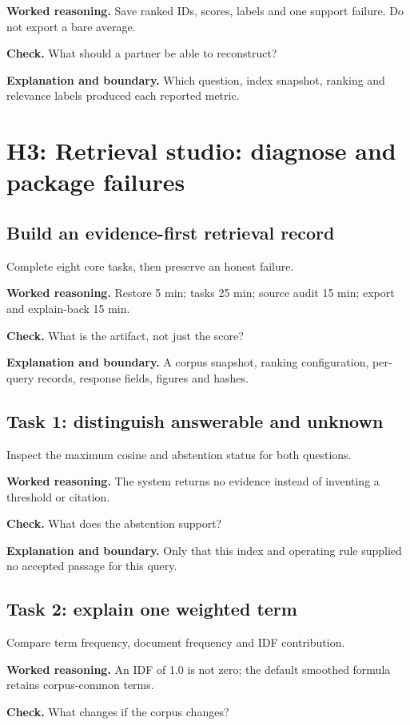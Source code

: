\textbf{Worked reasoning.} Save ranked IDs, scores, labels and one support failure. Do not export a bare average.

\textbf{Check.} What should a partner be able to reconstruct?

\textbf{Explanation and boundary.} Which question, index snapshot, ranking and relevance labels produced each reported metric.

\section{H3: Retrieval studio: diagnose and package failures}
\subsection{Build an evidence-first retrieval record}
Complete eight core tasks, then preserve an honest failure.

\textbf{Worked reasoning.} Restore 5 min; tasks 25 min; source audit 15 min; export and explain-back 15 min.

\textbf{Check.} What is the artifact, not just the score?

\textbf{Explanation and boundary.} A corpus snapshot, ranking configuration, per-query records, response fields, figures and hashes.

\subsection{Task 1: distinguish answerable and unknown}
Inspect the maximum cosine and abstention status for both questions.

\textbf{Worked reasoning.} The system returns no evidence instead of inventing a threshold or citation.

\textbf{Check.} What does the abstention support?

\textbf{Explanation and boundary.} Only that this index and operating rule supplied no accepted passage for this query.

\subsection{Task 2: explain one weighted term}
Compare term frequency, document frequency and IDF contribution.

\textbf{Worked reasoning.} An IDF of 1.0 is not zero; the default smoothed formula retains corpus-common terms.

\textbf{Check.} What changes if the corpus changes?

